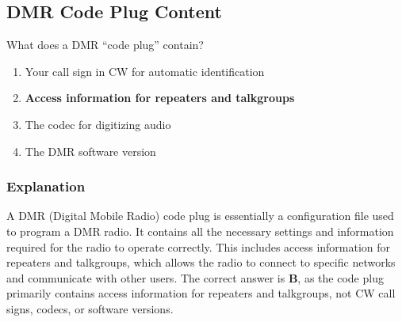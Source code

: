 \subsection{DMR Code Plug Content}
\label{T4B07}

\begin{tcolorbox}[colback=gray!10!white,colframe=black!75!black,title=T4B07]
What does a DMR “code plug” contain?
\begin{enumerate}[noitemsep]
    \item Your call sign in CW for automatic identification
    \item \textbf{Access information for repeaters and talkgroups}
    \item The codec for digitizing audio
    \item The DMR software version
\end{enumerate}
\end{tcolorbox}

\subsubsection*{Explanation}
A DMR (Digital Mobile Radio) code plug is essentially a configuration file used to program a DMR radio. It contains all the necessary settings and information required for the radio to operate correctly. This includes access information for repeaters and talkgroups, which allows the radio to connect to specific networks and communicate with other users. The correct answer is \textbf{B}, as the code plug primarily contains access information for repeaters and talkgroups, not CW call signs, codecs, or software versions.
